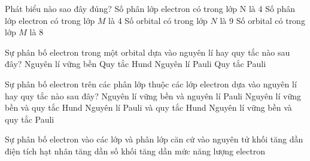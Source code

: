 \begin{vdex}
	Phát biểu nào sao đây đúng?
	\choice
	{\True Số phân lớp electron có trong lớp N là 4}
	{Số phân lớp electron có trong lớp $M$ là 4}
	{Số orbital có trong lớp $N$ là 9}
	{Số orbital có trong lớp $M$ là 8}
\end{vdex}
\begin{vd}
	Sự phân bố electron trong một orbital dựa vào nguyên lí hay quy tắc nào sau đây?
	\choice
	{Nguyên lí vững bền}
	{Quy tắc Hund}
	{\True Nguyên lí Pauli}
	{Quy tắc Pauli}
\end{vd}

\begin{vdex}
	Sự phân bố electron trên các phân lớp thuộc các lớp electron dựa vào nguyên lí hay quy tắc nào sau đây?
	\choice
	{Nguyên lí vững bền và nguyên lí Pauli}
	{\True Nguyên lí vững bền và quy tắc Hund}
	{Nguyên lí Pauli và quy tắc Hund}
	{Nguyên lí vững bền và quy tắc Pauli}
\end{vdex}

\begin{vdex}
	Sự phân bố electron vào các lớp và phân lớp căn cứ vào
	\choice
	{nguyên tử khối tăng dần}
	{điện tích hạt nhân tăng dần}
	{số khối tăng dần}
	{\True mức năng lượng electron}
	\loigiai{}
\end{vdex}


